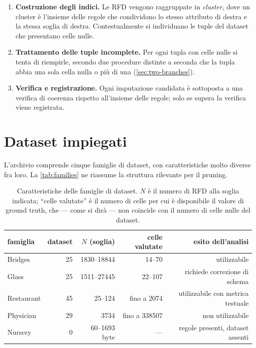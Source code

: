 \begin{enumerate}[leftmargin=1.6em]
    \item \textbf{Costruzione degli indici.} Le RFD vengono raggruppate in \emph{cluster},
    dove un cluster è l'insieme delle regole che condividono lo stesso attributo di destra e la
    stessa soglia di destra. Contestualmente si individuano le tuple del dataset che presentano
    celle nulle.
    \item \textbf{Trattamento delle tuple incomplete.} Per ogni tupla con celle nulle si tenta
    di riempirle, secondo due procedure distinte a seconda che la tupla abbia una sola cella
    nulla o più di una (\autoref{sec:two-branches}).
    \item \textbf{Verifica e registrazione.} Ogni imputazione candidata è sottoposta a una
    verifica di coerenza rispetto all'insieme delle regole; solo se supera la verifica viene
    registrata.
\end{enumerate}

\section{Dataset impiegati}\label{sec:datasets}

L'archivio comprende cinque famiglie di dataset, con caratteristiche molto diverse fra loro. La
\autoref{tab:families} ne riassume la struttura rilevante per il pruning.

\begin{table}[htbp]
\centering
\caption{Caratteristiche delle famiglie di dataset. $N$ è il numero di RFD alla soglia indicata;
``celle valutate'' è il numero di celle per cui è disponibile il valore di ground truth, che
--- come si dirà --- non coincide con il numero di celle nulle del dataset.}
\label{tab:families}
\footnotesize
\begin{tabular}{lrrrr}
\toprule
famiglia & dataset & $N$ (soglia) & celle valutate & esito dell'analisi \\
\midrule
Bridges    & 25 & \num{1830}--\num{18844} & 14--70   & utilizzabile \\
Glass      & 25 & \num{1511}--\num{27445} & 22--107  & richiede correzione di schema \\
Restaurant & 45 & 25--124               & fino a \num{2074} & utilizzabile con metrica testuale \\
Physician  & 29 & \num{3734}            & fino a \num{338507} & non utilizzabile \\
Nursery    &  0 & \num{60}--\num{1693} byte & ---      & regole presenti, dataset assenti \\
\bottomrule
\end{tabular}
\end{table}

